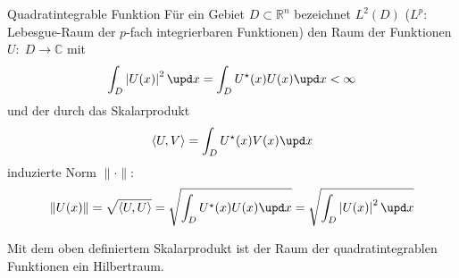   \begin{frame}
    \begin{block}{Quadratintegrable Funktion}
      Für ein Gebiet $D \subset \mathbb{R}^n$ bezeichnet $L^2(D)$ ($L^p$: Lebesgue-Raum der $p$-fach integrierbaren Funktionen) den Raum der Funktionen $U:\; D\to\mathbb{C}$ mit
      $$
      \int_D \left| U(x) \right|^2 \upd x = \int_D  U^\star(x) U(x)  \upd x< \infty
      $$
      und der durch das Skalarprodukt
      $$
      \langle U, V\rangle = \int_D U^\star(x)V(x) \upd x
      $$
      induzierte Norm $\| \cdot \|$:
      $$
      \| U(x) \| = \sqrt{\langle U, U\rangle} = \sqrt{\int_D  U^\star(x) U(x)  \upd x} = \sqrt{\int_D \left| U(x) \right|^2 \upd x}
      $$
    \end{block}\pause

Mit dem oben definiertem Skalarprodukt ist der Raum der quadratintegrablen Funktionen ein \alert{Hilbertraum}. 
    
  \end{frame}


